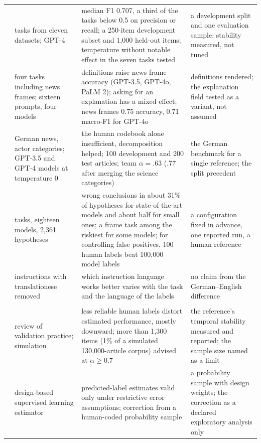 \begin{longtable}{@{}>{\raggedright\arraybackslash}p{26mm}>{\raggedright\arraybackslash}p{38mm}>{\raggedright\arraybackslash}p{48mm}>{\raggedright\arraybackslash}p{38mm}@{}}
\textcite{pangakis2025humansintheloop} & 27 tasks from eleven datasets; GPT-4 & median F1 0.707, a third of the tasks below 0.5 on precision or recall; a 250-item development subset and 1{,}000 held-out items; temperature without notable effect in the seven tasks tested & a development split and one evaluation sample; stability measured, not tuned \\
\textcite{atreja2025whatsinaprompt} & four tasks including news frames; sixteen prompts, four models & definitions raise news-frame accuracy (GPT-3.5, GPT-4o, PaLM 2); asking for an explanation has a mixed effect; news frames 0.75 accuracy, 0.71 macro-F1 for GPT-4o & definitions rendered; the explanation field tested as a variant, not assumed \\
\textcite{hohenwalde2025chatgptactors} & German news, actor categories; GPT-3.5 and GPT-4 models at temperature 0 & the human codebook alone insufficient, decomposition helped; 100 development and 200 test articles; team $\alpha = .63$ (.77 after merging the science categories) & the German benchmark for a single reference; the split precedent \\
\textcite{baumann2025llmhacking} & 37 tasks, eighteen models, 2{,}361 hypotheses & wrong conclusions in about 31\% of hypotheses for state-of-the-art models and about half for small ones; a frame task among the riskiest for some models; for controlling false positives, 100 human labels beat 100{,}000 model labels & a configuration fixed in advance, one reported run, a human reference \\
\textcite{enomoto2025fairtranslationese} & instructions with translationese removed & which instruction language works better varies with the task and the language of the labels & no claim from the German--English difference \\
\addlinespace
\multicolumn{4}{@{}l}{\emph{Validation and aggregates}} \\
\textcite{song2020validations} & review of validation practice; simulation & less reliable human labels distort estimated performance, mostly downward; more than 1{,}300 items (1\% of a simulated 130{,}000-article corpus) advised at $\alpha \geq 0.7$ & the reference's temporal stability measured and reported; the sample size named as a limit \\
\textcite{egami2023dsl} & design-based supervised learning estimator & predicted-label estimates valid only under restrictive error assumptions; correction from a human-coded probability sample & a probability sample with design weights; the correction as a declared exploratory analysis only \\

\end{longtable}
